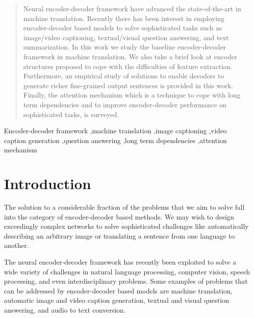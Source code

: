 \documentclass[preprint, 12pt]{elsarticle}
\begin{document}
\begin{frontmatter}
\begin{abstract}
		Neural encoder-decoder framework have advanced the state-of-the-art in machine translation. Recently there has been interest in employing encoder-decoder based models to solve sophisticated tasks such as image/video captioning,  textual/visual question answering, and text summarization. In this work we study the baseline encoder-decoder framework in machine translation. We also take a brief look at encoder structures proposed to cope with the difficulties of feature extraction. Furthermore, an empirical study of solutions to enable decoders to generate richer fine-grained output sentences is provided in this work. Finally, the attention mechanism which is a technique to cope with long term dependencies and to improve encoder-decoder performance on sophisticated tasks, is surveyed. 
		
		\end{abstract}
		
		\begin{keyword}
			
			
			Encoder-decoder framework \sep machine translation \sep image captioning \sep video caption generation \sep question answering \sep long term dependencies \sep attention mechanism	
		\end{keyword}
		
	\end{frontmatter}

	
	\section{Introduction}
	The solution to a considerable fraction of the problems that we aim to solve fall into the category of encoder-decoder based methods. We may wish to design exceedingly complex networks to solve sophisticated challenges like automatically describing an arbitrary image or translating a sentence from one language to another. 
	
	The neural encoder-decoder framework has recently been exploited to solve a wide variety of challenges in natural language processing, computer vision, speech processing, and even interdisciplinary problems. Some examples of problems that can be addressed by encoder-decoder based models are machine translation, automatic image and video caption generation, textual and visual question answering, and audio to text conversion.
	
\end{document}
